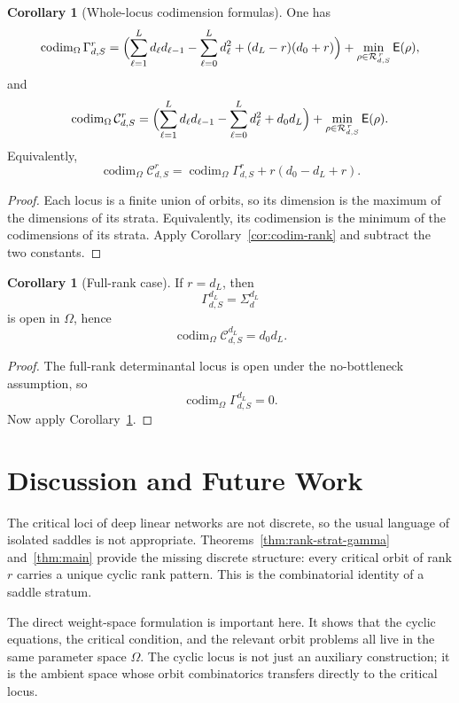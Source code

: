 \documentclass[11pt]{article}
\newcommand{\codim}{\operatorname{codim}}
\theoremstyle{definition}
\newtheorem{corollary}[theorem]{Corollary}
\begin{document}
\begin{corollary}[Whole-locus codimension formulas]
\label{cor:codim-whole}
One has
\[
\codim_{\Omega}\Gamma_{d,S}^r
=
\Bigl(
\sum_{\ell=1}^L d_\ell d_{\ell-1}
-\sum_{\ell=0}^L d_\ell^2
+(d_L-r)(d_0+r)
\Bigr)
+
\min_{\rho\in \mathcal R_{d,S}^{\,r}}\mathsf E(\rho),
\]
and
\[
\codim_{\Omega}\mathcal C_{d,S}^r
=
\Bigl(
\sum_{\ell=1}^L d_\ell d_{\ell-1}
-\sum_{\ell=0}^L d_\ell^2
+d_0d_L
\Bigr)
+
\min_{\rho\in \mathcal R_{d,S}^{\,r}}\mathsf E(\rho).
\]
Equivalently,
\[
\codim_{\Omega}\mathcal C_{d,S}^r
=
\codim_{\Omega}\Gamma_{d,S}^r+r(d_0-d_L+r).
\]
\end{corollary}

\begin{proof}
Each locus is a finite union of orbits, so its dimension is the maximum of the
dimensions of its strata. Equivalently, its codimension is the minimum of the
codimensions of its strata. Apply Corollary~\ref{cor:codim-rank} and subtract
the two constants.
\end{proof}

\begin{corollary}[Full-rank case]
\label{cor:full-rank-codim}
If \(r=d_L\), then
\[
\Gamma_{d,S}^{d_L}=\Sigma_d^{d_L}
\]
is open in \(\Omega\), hence
\[
\codim_{\Omega}\mathcal C_{d,S}^{d_L}=d_0d_L.
\]
\end{corollary}

\begin{proof}
The full-rank determinantal locus is open under the no-bottleneck assumption, so
\[
\codim_{\Omega}\Gamma_{d,S}^{d_L}=0.
\]
Now apply Corollary~\ref{cor:codim-whole}.
\end{proof}

\section{Discussion and Future Work}

The critical loci of deep linear networks are not discrete, so the usual
language of isolated saddles is not appropriate. Theorems~\ref{thm:rank-strat-gamma}
and~\ref{thm:main} provide the missing discrete structure: every critical orbit
of rank \(r\) carries a unique cyclic rank pattern. This is the combinatorial
identity of a saddle stratum.

The direct weight-space formulation is important here. It shows that the cyclic
equations, the critical condition, and the relevant orbit problems all live in
the same parameter space \(\Omega\). The cyclic locus is not just an auxiliary
construction; it is the ambient space whose orbit combinatorics transfers
directly to the critical locus.
\end{document}
